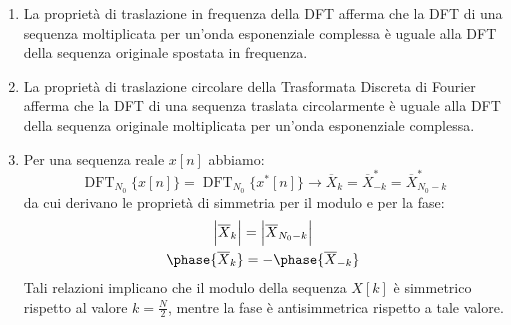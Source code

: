 \documentclass[
]{article}
\begin{document}
\begin{enumerate}
\item
  La proprietà di traslazione in frequenza della DFT afferma che la DFT
  di una sequenza moltiplicata per un'onda esponenziale complessa è
  uguale alla DFT della sequenza originale spostata in frequenza.
\item
  La proprietà di traslazione circolare della Trasformata Discreta di
  Fourier afferma che la DFT di una sequenza traslata circolarmente è
  uguale alla DFT della sequenza originale moltiplicata per un'onda
  esponenziale complessa.
\item
  Per una sequenza reale \(x[n]\) abbiamo: \[
  \operatorname{DFT}_{N_0}\Big\{ x[n] \Big\} = \operatorname{DFT}_{N_0}\Big\{x^{*}[n] \Big\} \to \overline{X}_k = \overline{X}^{*}_{-k} = \overline{X}^{*}_{N_0 -k}
  \] da cui derivano le proprietà di simmetria per il modulo e per la
  fase: \begin{gather*}
  \Big|\overline{X}_k \Big| = \Big| \overline{X}_{N_0 - k} \Big| \\
  \phase{\overline{X}_k} = -\phase{\overline{X}_{-k}}
  \end{gather*} Tali relazioni implicano che il modulo della sequenza
  \(X[k]\) è simmetrico rispetto al valore \(k = \frac{N}{2}\), mentre
  la fase è antisimmetrica rispetto a tale valore.


\end{enumerate}
\end{document}
